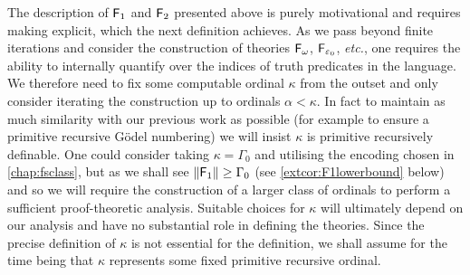 \documentclass[UKenglish,cleveref,DIV=12]{scrartcl}
\theoremstyle{definition}
\theoremstyle{definition}
\begin{document}
The description of $\mathsf{F}_1$ and $\mathsf{F}_2$ presented above is purely motivational and requires making
explicit, which the next definition achieves.
As we pass beyond finite iterations and consider the construction of theories
$\mathsf{F}_\omega$, $\mathsf{F}_{\varepsilon_0}$, {\em etc.},  one requires the ability
to internally quantify over the indices of truth predicates in the language. We
therefore need to fix some computable ordinal $\kappa$ from the outset and only
consider iterating the construction up to ordinals $\alpha<\kappa$. In fact to
maintain as much similarity with our previous work as possible ({for
example to ensure a primitive recursive Gödel numbering}) we will insist $\kappa$ is
primitive recursively definable. One could consider taking $\kappa=\Gamma_0$ and
utilising the encoding chosen in \cref{chap:fsclass}, but as we shall see
$\lVert{\mathsf{F}_1}\rVert\ge\Gamma_0$ (see \cref{extcor:F1lowerbound} below) and so we will
require the construction of a larger class of ordinals to perform a sufficient
proof-theoretic analysis. Suitable choices for $\kappa$ will ultimately depend on our
analysis and have no substantial role in defining the theories. Since the
precise definition of $\kappa$ is not essential for the definition, we shall
assume for the time being that $\kappa$ represents some fixed primitive
recursive ordinal.
\end{document}
